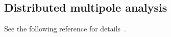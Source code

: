 \subsection{Distributed multipole analysis}

See the following reference for details~\cite{stone_distributed_2005}.